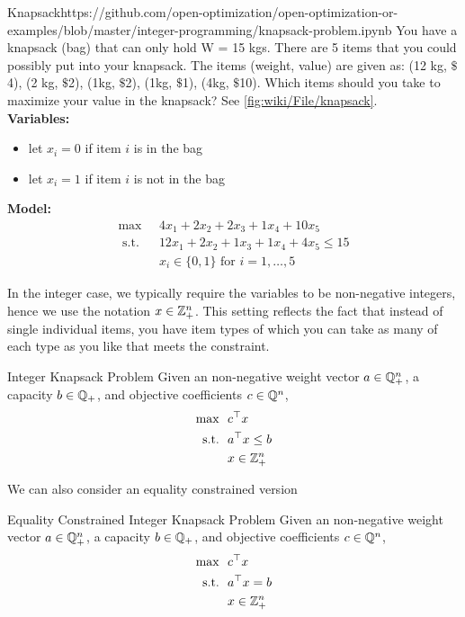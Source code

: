 \begin{examplewithcode}{Knapsack}{https://github.com/open-optimization/open-optimization-or-examples/blob/master/integer-programming/knapsack-problem.ipynb}
\label{example:knapsack}
You have a knapsack (bag) that can only hold W = 15 kgs.  There are 5 items that you could possibly put into your knapsack.  The items (weight, value) are given as:
(12 kg, $\$$4), (2 kg, $\$$2), (1kg, $\$$2), (1kg, $\$$1), (4kg, $\$$10).  Which items should you take to maximize your value in the knapsack? See \autoref{fig:wiki/File/knapsack}.\\

\noindent \textbf{Variables:}
\begin{itemize}
\item let $x_i = 0$ if item $i$ is in the bag
\item let $x_i = 1$ if item $i$ is not in the bag
\end{itemize}
\textbf{Model:}
\begin{align}
\max  \  \ &4 x_1 + 2 x_2 + 2 x_3 + 1 x_4 + 10 x_5 \tag{Total value}\\
\text{ s.t. }\ \ &  12 x_1 + 2 x_2 + 1 x_3 + 1 x_4 + 4 x_5 \leq 15 \tag{Capacity bound}\\
& x_i \in \{0,1\} \text{ for } i=1, \dots, 5 \tag{Item taken or not}
\end{align}
\end{examplewithcode}
In the integer case, we typically require the variables to be non-negative integers, hence we use the notation $x \in {\mathbb{Z}}^n_+$.  This setting reflects the fact that instead of single individual items, you have item types of which you can take as many of each type as you like that meets the constraint.
\begin{general}{Integer Knapsack Problem}{\npcomplete}
Given an non-negative weight vector $a \in {\mathbb{Q}}^n_+$, a capacity $b \in {\mathbb{Q}}_+$, and objective coefficients $c \in {\mathbb{Q}}^n$, 
\begin{equation}
\begin{split}
\max \ \ & c^\top x\\
\mbox{s.t.}\ \ & a^\top x \leq b\\
& x \in {\mathbb{Z}}^n_+
\end{split}
\end{equation}
\end{general}
We can also consider an equality constrained version
\begin{general}{Equality Constrained Integer Knapsack Problem}{\nphard}
Given an non-negative weight vector $a \in {\mathbb{Q}}^n_+$, a capacity $b \in {\mathbb{Q}}_+$, and objective coefficients $c \in {\mathbb{Q}}^n$, 
\begin{align}
\max \ \ & c^\top x\\
\mbox{s.t.}\ \ & a^\top x = b\\
& x \in {\mathbb{Z}}^n_+
\end{align}
\end{general}



